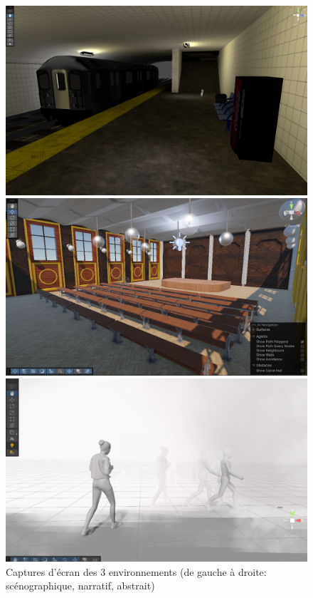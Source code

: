 \begin{figure}[h]
  \centering

  \begin{minipage}[b]{0.31\textwidth}
    \centering
    \includegraphics[width=\textwidth]{images/metro1.png}
  \end{minipage}
  \hfill
  \begin{minipage}[b]{0.33\textwidth}
    \centering
    \includegraphics[width=\textwidth]{images/Amphi.png}
  \end{minipage}
  \hfill
  \begin{minipage}[b]{0.32\textwidth}
    \centering
    \includegraphics[width=\textwidth]{images/Fog3.png}
  \end{minipage}

  \caption{Captures d'écran des 3 environnements (de gauche à droite: scénographique, narratif, abstrait)}
  \label{fig:trois_images}
\end{figure}

